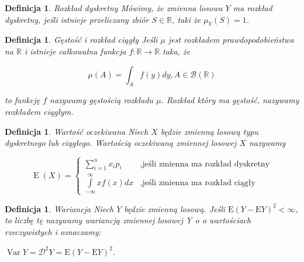 \documentclass[12pt,a4paper]{report}
\newtheorem{definition}[theorem]{Definicja}
\newcommand{\Ex}{\operatorname{E}}
\newcommand{\Variance}{\operatorname{Var}}
\begin{document}
\begin{definition}{Rozkład dyskretny \cite[Rozdział 5.1]{jakubowski2004}}
Mówimy, że zmienna losowa $Y$ ma rozkład dyskretny, jeśli istnieje przeliczany zbiór $S \in \mathbb{R}$, taki że $\mu_Y(S)=1$.
\end{definition}


\begin{definition}{Gęstość i rozkład ciągły \cite[Rozdział 5.1]{jakubowski2004}}
Jeśli $\mu$ jest rozkładem prawdopodobieństwa na $\mathbb{R}$ i istnieje całkowalna funkcja $f: \mathbb{R} \rightarrow \mathbb{R}$ taka, że 

$$\mu(A)=\int_A f(y)dy,   A\in \mathcal{B}(\mathbb{R})  $$  %

to funkcję $f$ nazywamy gęstością rozkładu $\mu$. Rozkład który ma gęstość, nazywamy rozkładem ciągłym. 
\end{definition}



\begin{definition}{Wartość oczekiwana \cite[Rozdział 2.6]{krysicki1999}}
Niech $X$ będzie zmienną losową typu dyskretnego lub ciągłego. Wartością oczekiwaną zmiennej losowej $X$ nazywamy 

$$
\Ex (X)=\left\{ \begin{array}{ll}
\sum\limits_{i=1}^{n} {x_ip_i} &, \textrm{jeśli zmienna ma rozkład dyskretny}\\ 
\int\limits_{-\infty}^{\infty} {xf(x)dx} &, \textrm{jeśli zmienna ma rozkład ciągły}
\end{array} \right.
$$

\end{definition}


\begin{definition}{Wariancja \cite [Rozdział5.6]{jakubowski2004}}
Niech $Y$ będzie zmienną losową. Jeśli $\mathrm{E}(Y-\mathrm{E}Y)^2 < \infty$, to liczbę tę nazywamy wariancją zmiennej losowej Y o o wartościach rzeczywistych i oznaczamy:

$\Variance Y= \mathcal{D}^2Y=\mathrm{E}(Y-\mathrm{E}Y)^2$.

\end{definition}
\end{document}
